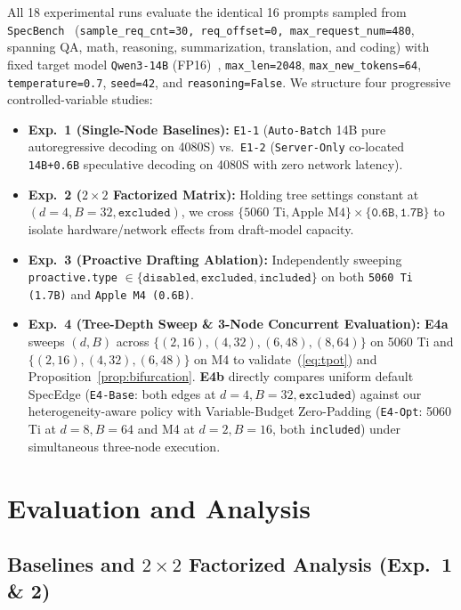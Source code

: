 \documentclass[10pt,conference]{IEEEtran}
\begin{document}
All 18 experimental runs evaluate the identical 16 prompts sampled from \texttt{SpecBench}~\cite{liu2024specbench} (\texttt{sample\_req\_cnt=30, req\_offset=0, max\_request\_num=480}, spanning QA, math, reasoning, summarization, translation, and coding) with fixed target model \texttt{Qwen3-14B} (FP16)~\cite{qwen3}, \texttt{max\_len=2048}, \texttt{max\_new\_tokens=64}, \texttt{temperature=0.7}, \texttt{seed=42}, and \texttt{reasoning=False}. We structure four progressive controlled-variable studies:
\begin{itemize}
  \item \textbf{Exp.\ 1 (Single-Node Baselines):} \texttt{E1-1} (\texttt{Auto-Batch} 14B pure autoregressive decoding on 4080S) vs.\ \texttt{E1-2} (\texttt{Server-Only} co-located \texttt{14B+0.6B} speculative decoding on 4080S with zero network latency).
  \item \textbf{Exp.\ 2 ($2\times 2$ Factorized Matrix):} Holding tree settings constant at $(d{=}4, B{=}32, \texttt{excluded})$, we cross $\{\text{5060 Ti}, \text{Apple M4}\} \times \{\texttt{0.6B}, \texttt{1.7B}\}$ to isolate hardware/network effects from draft-model capacity.
  \item \textbf{Exp.\ 3 (Proactive Drafting Ablation):} Independently sweeping \texttt{proactive.type} $\in \{\texttt{disabled}, \texttt{excluded}, \texttt{included}\}$ on both \texttt{5060 Ti (1.7B)} and \texttt{Apple M4 (0.6B)}.
  \item \textbf{Exp.\ 4 (Tree-Depth Sweep \& 3-Node Concurrent Evaluation):} \textbf{E4a} sweeps $(d, B)$ across $\{(2,16), (4,32), (6,48), (8,64)\}$ on 5060 Ti and $\{(2,16), (4,32), (6,48)\}$ on M4 to validate~(\ref{eq:tpot}) and Proposition~\ref{prop:bifurcation}. \textbf{E4b} directly compares uniform default SpecEdge (\texttt{E4-Base}: both edges at $d{=}4, B{=}32, \texttt{excluded}$) against our heterogeneity-aware policy with Variable-Budget Zero-Padding (\texttt{E4-Opt}: 5060 Ti at $d{=}8, B{=}64$ and M4 at $d{=}2, B{=}16$, both \texttt{included}) under simultaneous three-node execution.
\end{itemize}

\section{Evaluation and Analysis}

\subsection{Baselines and $2\times 2$ Factorized Analysis (Exp.\ 1 \& 2)}
\end{document}
